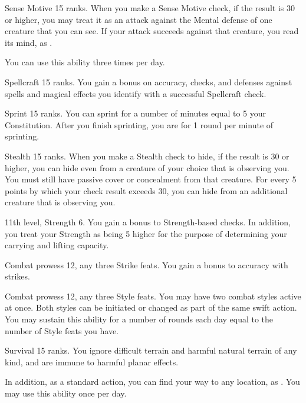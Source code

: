\featpre Sense Motive 15 ranks.
\featben When you make a Sense Motive check, if the result is 30 or higher, you may treat it as an attack against the Mental defense of one creature that you can see.
If your attack succeeds against that creature, you read its mind, as .

You can use this ability three times per day.

\featpre Spellcraft 15 ranks.
\featben You gain a  bonus on accuracy, checks, and defenses against spells and magical effects you identify with a successful Spellcraft check.

\featpre Sprint 15 ranks.
\featben You can sprint for a number of minutes equal to 5 \add your Constitution.
After you finish sprinting, you are \fatigued for 1 round per minute of sprinting.

\featpre Stealth 15 ranks.
\featben When you make a Stealth check to hide, if the result is 30 or higher, you can hide even from a creature of your choice that is observing you.
You must still have passive cover or concealment from that creature.
For every 5 points by which your check result exceeds 30, you can hide from an additional creature that is observing you.

\featpres 11th level, Strength 6.
\featben You gain a  bonus to Strength-based checks.
In addition, you treat your Strength as being 5 higher for the purpose of determining your carrying and lifting capacity.

\featpres Combat prowess 12, any three Strike feats.
\featben You gain a  bonus to accuracy with strikes.

\featpres Combat prowess 12, any three Style feats.
\featben You may have two combat styles active at once.
Both styles can be initiated or changed as part of the same swift action.
You may sustain this ability for a number of rounds each day equal to the number of Style feats you have.

\featpre Survival 15 ranks.
\featben You ignore difficult terrain and harmful natural terrain of any kind, and are immune to harmful planar effects.

In addition, as a standard action, you can find your way to any location, as .
You may use this ability once per day.


